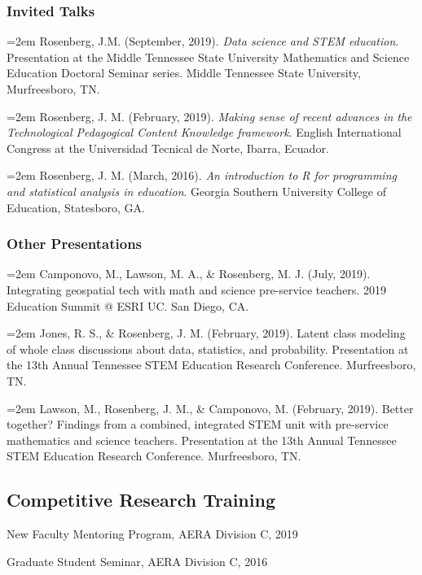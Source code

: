 \documentclass[14,]{article}
\begin{document}
\subsubsection{Invited Talks}\label{invited-talks}

\hangindent=2em Rosenberg, J.M. (September, 2019). \emph{Data science
and STEM education}. Presentation at the Middle Tennessee State
University Mathematics and Science Education Doctoral Seminar series.
Middle Tennessee State University, Murfreesboro, TN.

\hangindent=2em Rosenberg, J. M. (February, 2019). \emph{Making sense of
recent advances in the Technological Pedagogical Content Knowledge
framework}. English International Congress at the Universidad Tecnical
de Norte, Ibarra, Ecuador.

\hangindent=2em Rosenberg, J. M. (March, 2016). \emph{An introduction to
R for programming and statistical analysis in education}. Georgia
Southern University College of Education, Statesboro, GA.

\subsubsection{Other Presentations}\label{other-presentations}

\hangindent=2em Camponovo, M., Lawson, M. A., \& Rosenberg, M. J. (July,
2019). Integrating geospatial tech with math and science pre-service
teachers. 2019 Education Summit @ ESRI UC. San Diego, CA.

\hangindent=2em Jones, R. S., \& Rosenberg, J. M. (February, 2019).
Latent class modeling of whole class discussions about data, statistics,
and probability. Presentation at the 13th Annual Tennessee STEM
Education Research Conference. Murfreesboro, TN.

\hangindent=2em Lawson, M., Rosenberg, J. M., \& Camponovo, M.
(February, 2019). Better together? Findings from a combined, integrated
STEM unit with pre-service mathematics and science teachers.
Presentation at the 13th Annual Tennessee STEM Education Research
Conference. Murfreesboro, TN.

\subsection{Competitive Research
Training}\label{competitive-research-training}

New Faculty Mentoring Program, AERA Division C, 2019

Graduate Student Seminar, AERA Division C, 2016
\end{document}
